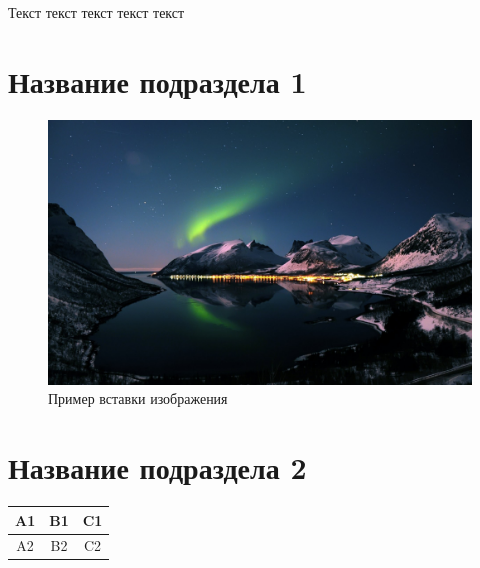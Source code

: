 Текст текст текст текст текст\\

\section{Название подраздела 1}

\begin{figure}[H]
    \begin{center}
        \includegraphics[width=0.7\linewidth]{src/img/img_example.png}
        \caption{Пример вставки изображения}
        \label{fig:img_example}
    \end{center}
\end{figure}

\section{Название подраздела 2}

\begin{center}
    \begin{tabular}{|c|c|c|}
        \hline
        A1 & B1 & C1 \\ \hline
        A2 & B2 & C2 \\ \hline
    \end{tabular}
\end{center}
\label{tab:tab_example}


